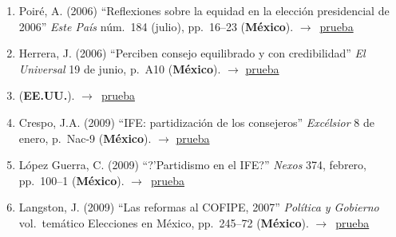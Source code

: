 \documentclass[12 pt, letter]{article}
\newenvironment{CitasMiTrabajo}{
    \begin{footnotesize}
    \begin{enumerate}[label={\footnotesize\emph{cita~\arabic*}},ref=\arabic*] %
        \setlength{\itemsep}{.1\itemsep}
        \setlength{\parskip}{.1\parskip}
    }{\end{enumerate}\end{footnotesize}}
\begin{document}

        \begin{CitasMiTrabajo}

        \item Poir\'e, A. (2006)
        ``Reflexiones sobre la equidad en la
        elecci\'on presidencial de 2006'' \emph{Este Pa\'is} n\'um.\ 184
        (julio), pp.\ 16--23  (\textbf{M\'exico}). $\rightarrow$~\href{http://ericmagar.com/cv/cites/estevezEtalElecStud/poire.pdf}{prueba}

        \item Herrera, J. (2006)
        ``Perciben consejo equilibrado y con
        credibilidad'' \emph{El Universal} 19 de junio, p.\ A10  (\textbf{M\'exico}). $\rightarrow$ \href{http://ericmagar.com/cv/cites/estevezEtalElecStud/univ.pdf}{prueba}

        \item {} (\textbf{EE.UU.}). $\rightarrow$~\href{http://ericmagar.com/cv/cites/estevezEtalElecStud/eisen.pdf}{prueba}

        \item Crespo, J.A. (2009)
        ``IFE: partidizaci\'on de los consejeros''
        \emph{Exc\'elsior} 8 de enero, p.\ Nac-9 (\textbf{M\'exico}). $\rightarrow$ \href{http://ericmagar.com/cv/cites/estevezEtalElecStud/crespo.pdf}{prueba}

        \item L\'opez Guerra, C. (2009)
        ``?'Partidismo en el IFE?''
        \emph{Nexos} 374, febrero, pp.\ 100--1 (\textbf{M\'exico}). $\rightarrow$~\href{http://ericmagar.com/cv/cites/estevezEtalElecStud/lg.pdf}{prueba}

        \item Langston, J. (2009) ``Las reformas al COFIPE, 2007''
            \emph{Pol\'itica y Gobierno}
            vol.\ tem\'atico Elecciones en M\'exico, pp.\ 245--72 (\textbf{M\'exico}). $\rightarrow$~\href{http://ericmagar.com/cv/cites/estevezEtalElecStud/langstonRefCofipe2009pyg.excerpt.pdf}{prueba}
            

\end{CitasMiTrabajo}
\end{document}
